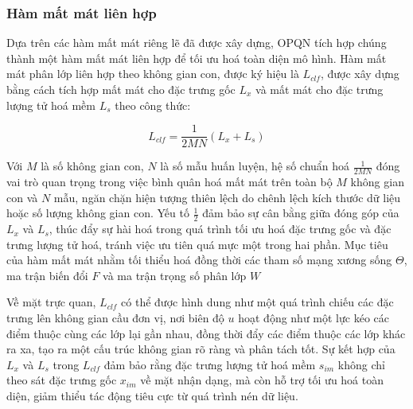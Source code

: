 \subsubsection{Hàm mất mát liên hợp}
Dựa trên các hàm mất mát riêng lẽ đã được xây dựng, OPQN tích hợp chúng thành một hàm mất mát liên hợp để tối ưu hoá toàn diện mô hình. Hàm mất mát phân lớp liên hợp theo không gian con, được ký hiệu là $L_{clf}$, được xây dựng bằng cách tích hợp mất mát cho đặc trưng gốc $L_x$ và mất mát cho đặc trưng lượng tử hoá mềm $L_s$ theo công thức:

\begin{equation}
L_{clf} = \frac{1}{2MN} (L_x + L_s)
\end{equation}

Với $M$ là số không gian con, $N$ là số mẫu huấn luyện, hệ số chuẩn hoá $\frac{1}{2MN}$ đóng vai trò quan trọng trong việc bình quân hoá mất mát trên toàn bộ $M$ không gian con và $N$ mẫu, ngăn chặn hiện tượng thiên lệch do chênh lệch kích thước dữ liệu hoặc số lượng không gian con. Yếu tố $\frac{1}{2}$ đảm bảo sự cân bằng giữa đóng góp của $L_x$ và $L_s$, thúc đẩy sự hài hoá trong quá trình tối ưu hoá đặc trưng gốc và đặc trưng lượng tử hoá, tránh việc ưu tiên quá mực một trong hai phần. Mục tiêu của hàm mất mát nhằm tối thiểu hoá đồng thời các tham số mạng xương sống $ \Theta $, ma trận biến đổi $F$ và ma trận trọng số phân lớp $W$

 

Về mặt trực quan, $L_{clf}$ có thể được hình dung như một quá trình chiếu các đặc trưng lên không gian cầu đơn vị, nơi biên độ $u$ hoạt động như một lực kéo các điểm thuộc cùng các lớp lại gần nhau, đồng thời đẩy các điểm thuộc các lớp khác ra xa, tạo ra một cấu trúc không gian rõ ràng và phân tách tốt. Sự kết hợp của $L_x$ và $L_s$ trong $L_{clf}$ đảm bảo rằng đặc trưng lượng tử hoá mềm $s_{im}$ không chỉ theo sát đặc trưng gốc $x_{im}$ về mặt nhận dạng, mà còn hỗ trợ tối ưu hoá toàn diện, giảm thiểu tác động tiêu cực từ quá trình nén dữ liệu. 

